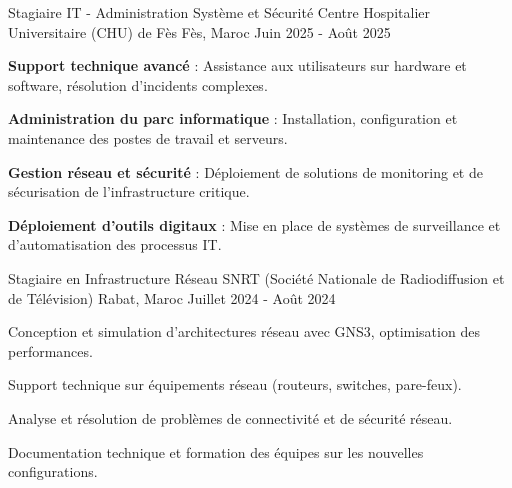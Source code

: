 
\begin{cventries}

  \cventry
  {Stagiaire IT - Administration Système et Sécurité} %
  {Centre Hospitalier Universitaire (CHU) de Fès} %
  {Fès, Maroc} %
  {Juin 2025 - Août 2025} %
  {
    \begin{cvitems}
      \item {
                  \textbf{Support technique avancé} : Assistance aux utilisateurs sur hardware et software, résolution d'incidents complexes.}
      \item {
                  \textbf{Administration du parc informatique} : Installation, configuration et maintenance des postes de travail et serveurs.}
      \item {
                  \textbf{Gestion réseau et sécurité} : Déploiement de solutions de monitoring et de sécurisation de l'infrastructure critique.}
      \item {
                  \textbf{Déploiement d'outils digitaux} : Mise en place de systèmes de surveillance et d'automatisation des processus IT.}
    \end{cvitems}
  }

  \cventry
  {Stagiaire en Infrastructure Réseau} %
  {SNRT (Société Nationale de Radiodiffusion et de Télévision)} %
  {Rabat, Maroc} %
  {Juillet 2024 - Août 2024} %
  {
    \begin{cvitems} %
      \item {Conception et simulation d'architectures réseau avec GNS3, optimisation des performances.}
      \item {Support technique sur équipements réseau (routeurs, switches, pare-feux).}
      \item {Analyse et résolution de problèmes de connectivité et de sécurité réseau.}
      \item {Documentation technique et formation des équipes sur les nouvelles configurations.}
    \end{cvitems}
  }
\end{cventries}